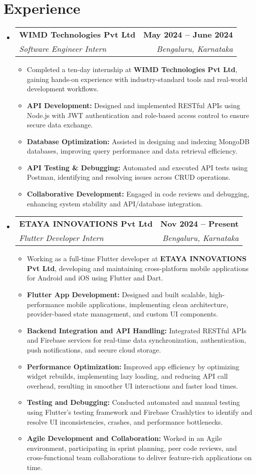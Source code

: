 \documentclass[a4paper,11pt]{article}
\makeatletter
\newcommand{\resumeItem}[1]{
	\item\small{#1 \vspace{-2pt}}
}
\newcommand{\resumeSubheading}[4]{
	\vspace{-2pt}\item
		\begin{tabular*}{0.97\textwidth}[t]{l@{\extracolsep{\fill}}r}
			\textbf{#1} & \textbf{\small #2} \\
			\textit{\small#3} & \textit{\small #4} \\
		\end{tabular*}\vspace{-7pt}
}
\newcommand{\resumeSubHeadingListStart}{\begin{itemize}[leftmargin=0.15in, label={}]}
\newcommand{\resumeSubHeadingListEnd}{\end{itemize}}
\newcommand{\resumeItemListStart}{\begin{itemize}}
\newcommand{\resumeItemListEnd}{\end{itemize}\vspace{-5pt}}
\makeatother
\begin{document}
\section{Experience}
\resumeSubHeadingListStart
\resumeSubheading
{WIMD Technologies Pvt Ltd}{May 2024 -- June 2024}
{Software Engineer Intern}{Bengaluru, Karnataka}
\resumeItemListStart
\resumeItem{Completed a ten-day internship at \textbf{WIMD Technologies Pvt Ltd}, gaining hands-on experience with industry-standard tools and real-world development workflows.}
\resumeItem{\textbf{API Development:} Designed and implemented RESTful APIs using Node.js with JWT authentication and role-based access control to ensure secure data exchange.}
\resumeItem{\textbf{Database Optimization:} Assisted in designing and indexing MongoDB databases, improving query performance and data retrieval efficiency.}
\resumeItem{\textbf{API Testing \& Debugging:} Automated and executed API tests using Postman, identifying and resolving issues across CRUD operations.}
\resumeItem{\textbf{Collaborative Development:} Engaged in code reviews and debugging, enhancing system stability and API/database integration.}
\resumeItemListEnd
\resumeSubheading
{ETAYA INNOVATIONS Pvt Ltd}{Nov 2024 -- Present}
{Flutter Developer Intern}{Bengaluru, Karnataka}
\resumeItemListStart
\resumeItem{Working as a full-time Flutter developer at \textbf{ETAYA INNOVATIONS Pvt Ltd}, developing and maintaining cross-platform mobile applications for Android and iOS using Flutter and Dart.}
\resumeItem{\textbf{Flutter App Development:} Designed and built scalable, high-performance mobile applications, implementing clean architecture, provider-based state management, and custom UI components.}
\resumeItem{\textbf{Backend Integration and API Handling:} Integrated RESTful APIs and Firebase services for real-time data synchronization, authentication, push notifications, and secure cloud storage.}
\resumeItem{\textbf{Performance Optimization:} Improved app efficiency by optimizing widget rebuilds, implementing lazy loading, and reducing API call overhead, resulting in smoother UI interactions and faster load times.}
\resumeItem{\textbf{Testing and Debugging:} Conducted automated and manual testing using Flutter's testing framework and Firebase Crashlytics to identify and resolve UI inconsistencies, crashes, and performance bottlenecks.}
\resumeItem{\textbf{Agile Development and Collaboration:} Worked in an Agile environment, participating in sprint planning, peer code reviews, and cross-functional team collaborations to deliver feature-rich applications on time.}
\resumeItemListEnd
\resumeSubHeadingListEnd
\end{document}
